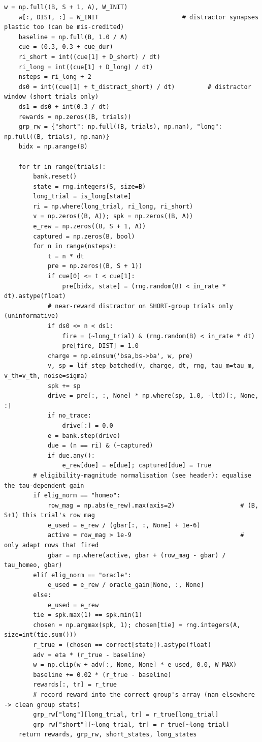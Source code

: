 \begin{lstlisting}[caption={mrl\_trace/extensions.py},label={lst:siox-src-extensions}]
    w = np.full((B, S + 1, A), W_INIT)
    w[:, DIST, :] = W_INIT                       # distractor synapses plastic too (can be mis-credited)
    baseline = np.full(B, 1.0 / A)
    cue = (0.3, 0.3 + cue_dur)
    ri_short = int((cue[1] + D_short) / dt)
    ri_long = int((cue[1] + D_long) / dt)
    nsteps = ri_long + 2
    ds0 = int((cue[1] + t_distract_short) / dt)         # distractor window (short trials only)
    ds1 = ds0 + int(0.3 / dt)
    rewards = np.zeros((B, trials))
    grp_rw = {"short": np.full((B, trials), np.nan), "long": np.full((B, trials), np.nan)}
    bidx = np.arange(B)

    for tr in range(trials):
        bank.reset()
        state = rng.integers(S, size=B)
        long_trial = is_long[state]
        ri = np.where(long_trial, ri_long, ri_short)
        v = np.zeros((B, A)); spk = np.zeros((B, A))
        e_rew = np.zeros((B, S + 1, A))
        captured = np.zeros(B, bool)
        for n in range(nsteps):
            t = n * dt
            pre = np.zeros((B, S + 1))
            if cue[0] <= t < cue[1]:
                pre[bidx, state] = (rng.random(B) < in_rate * dt).astype(float)
            # near-reward distractor on SHORT-group trials only (uninformative)
            if ds0 <= n < ds1:
                fire = (~long_trial) & (rng.random(B) < in_rate * dt)
                pre[fire, DIST] = 1.0
            charge = np.einsum('bsa,bs->ba', w, pre)
            v, sp = lif_step_batched(v, charge, dt, rng, tau_m=tau_m, v_th=v_th, noise=sigma)
            spk += sp
            drive = pre[:, :, None] * np.where(sp, 1.0, -ltd)[:, None, :]
            if no_trace:
                drive[:] = 0.0
            e = bank.step(drive)
            due = (n == ri) & (~captured)
            if due.any():
                e_rew[due] = e[due]; captured[due] = True
        # eligibility-magnitude normalisation (see header): equalise the tau-dependent gain
        if elig_norm == "homeo":
            row_mag = np.abs(e_rew).max(axis=2)                  # (B, S+1) this trial's row mag
            e_used = e_rew / (gbar[:, :, None] + 1e-6)
            active = row_mag > 1e-9                              # only adapt rows that fired
            gbar = np.where(active, gbar + (row_mag - gbar) / tau_homeo, gbar)
        elif elig_norm == "oracle":
            e_used = e_rew / oracle_gain[None, :, None]
        else:
            e_used = e_rew
        tie = spk.max(1) == spk.min(1)
        chosen = np.argmax(spk, 1); chosen[tie] = rng.integers(A, size=int(tie.sum()))
        r_true = (chosen == correct[state]).astype(float)
        adv = eta * (r_true - baseline)
        w = np.clip(w + adv[:, None, None] * e_used, 0.0, W_MAX)
        baseline += 0.02 * (r_true - baseline)
        rewards[:, tr] = r_true
        # record reward into the correct group's array (nan elsewhere -> clean group stats)
        grp_rw["long"][long_trial, tr] = r_true[long_trial]
        grp_rw["short"][~long_trial, tr] = r_true[~long_trial]
    return rewards, grp_rw, short_states, long_states



\end{lstlisting}
